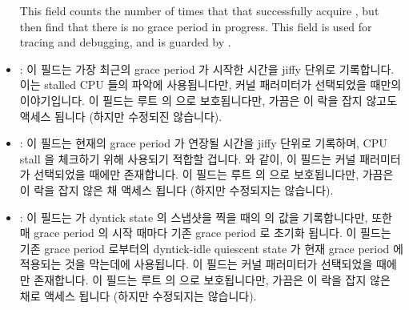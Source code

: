 \begin{itemize}
	This field counts the number of times that
	 that successfully acquire
	, but then find that there is no grace period
	in progress.
	This field is used for tracing and debugging, and
	is guarded by .
	\fi
\item	{}:
	이 필드는 가장 최근의 grace period 가 시작한 시간을 jiffy 단위로
	기록합니다.
	이는 stalled CPU 들의 파악에 사용됩니다만,
	 커널 패러미터가 선택되었을 때만의
	이야기입니다.
	이 필드는 루트  의  으로 보호됩니다만, 가끔은
	이 락을 잡지 않고도 액세스 됩니다 (하지만 수정되진 않습니다).
	\iffalse

	This field records the time at which the most recent grace period
	began, in jiffies.
	This is used to detect stalled CPUs, but only when the
	\co{CONFIG_RCU_CPU_STALL_DETECTOR} kernel parameter is selected.
	This field is guarded by the root \co{rcu_node}'s \co{->lock},
	but is sometimes accessed (but not modified) outside of this
	lock.
	\fi
\item	{}:
	이 필드는 현재의 grace period 가 연장될 시간을 jiffy 단위로 기록하며,
	CPU stall 을 체크하기 위해 사용되기 적합할 겁니다.
	 와 같이, 이 필드는 
	커널 패러미터가 선택되었을 때에만 존재합니다.
	이 필드는 루트  의  으로 보호됩니다만, 가끔은
	이 락을 잡지 않은 채 액세스 됩니다 (하지만 수정되지는 않습니다).
	\iffalse

	This field holds the time, in jiffies, at which the current
	grace period will have extended for so long that it will
	be appropriate to check for CPU stalls.
	As with \co{->gp_start}, this field exists only when the
	\co{CONFIG_RCU_CPU_STALL_DETECTOR} kernel parameter is selected.
	This field is guarded by the root \co{rcu_node}'s \co{->lock},
	but is sometimes accessed (but not modified) outside of this
	lock.
	\fi
\item	{}:
	이 필드는  가 dyntick state 의 스냅샷을
	찍을 때의  의 값을 기록합니다만, 또한 매 grace period
	의 시작 때마다 기존 grace period 로 초기화 됩니다.
	이 필드는 기존 grace period 로부터의 dyntick-idle quiescent state 가
	현재 grace period 에 적용되는 것을 막는데에 사용됩니다.
	이 필드는  커널 패러미터가 선택되었을 때에만
	존재합니다.
	이 필드는 루트  의  으로 보호됩니다만, 가끔은
	이 락을 잡지 않은 채로 액세스 됩니다 (하지만 수정되지는 않습니다).
	\iffalse

	This field records the value of \co{->completed} at the time when
	\co{force_quiescent_state()} snapshots dyntick state, but
	is also initialized to an earlier grace period at the beginning
	of each grace period.
	This field is used to prevent dyntick-idle quiescent states
	from a prior grace period from being applied to the current
	grace period.
	As such, this field exists only when the \co{CONFIG_NO_HZ}
	kernel parameter is selected.
	This field is guarded by the root \co{rcu_node}'s \co{->lock},
	but is sometimes accessed (but not modified) outside of this
	lock.
	\fi
\end{itemize}

